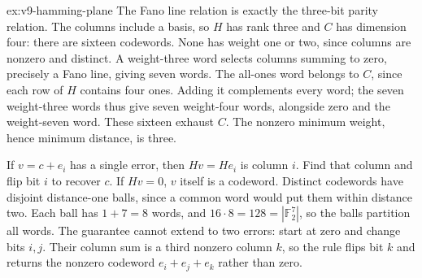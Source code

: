 \begin{solution}{ex:v9-hamming-plane}
\idea The Fano line relation is exactly the three-bit parity relation.
\writeup The columns include a basis, so $H$ has rank three and $C$ has dimension four: there are sixteen codewords. None has weight one or two, since columns are nonzero and distinct. A weight-three word selects columns summing to zero, precisely a Fano line, giving seven words. The all-ones word belongs to $C$, since each row of $H$ contains four ones. Adding it complements every word; the seven weight-three words thus give seven weight-four words, alongside zero and the weight-seven word. These sixteen exhaust $C$. The nonzero minimum weight, hence minimum distance, is three.

If $v=c+e_i$ has a single error, then $Hv=He_i$ is column $i$. Find that column and flip bit $i$ to recover $c$. If $Hv=0$, $v$ itself is a codeword. Distinct codewords have disjoint distance-one balls, since a common word would put them within distance two. Each ball has $1+7=8$ words, and $16\cdot8=128=|\mathbb F_2^7|$, so the balls partition all words. The guarantee cannot extend to two errors: start at zero and change bits $i,j$. Their column sum is a third nonzero column $k$, so the rule flips bit $k$ and returns the nonzero codeword $e_i+e_j+e_k$ rather than zero.
\end{solution}
